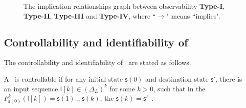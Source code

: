  \begin{figure}[thpb]
     \centering
      
     \caption{The implication relationships graph between observability {\bf Type-I}, {\bf Type-II}, {\bf Type-III} and {\bf Type-IV}, where ``$\rightarrow$" means ``implies".}
      \label{fig:9}
   \end{figure}




\subsection{Controllability and identifiability of \BCNs}

The controllability and identifiability of \BCNs\ are stated as follows. 

\begin{definition}[Controllability]
	A \BCN\ is controllable if for any initial state $\mathsf{s}(0)$ and destination state $\mathsf{s}'$, there is an input sequence $\mathsf{I}[k]\in(\Delta_L)^k$ for some $k>0$, such that in the $F^k_{\mathsf{s}(0)}(\mathsf{I}[k])=\mathsf{s}(1) \ldots\, \mathsf{s}(k)$, the $\mathsf{s}(k)=\mathsf{s}'$~\cite{cheng2009controllability}.
\end{definition}

